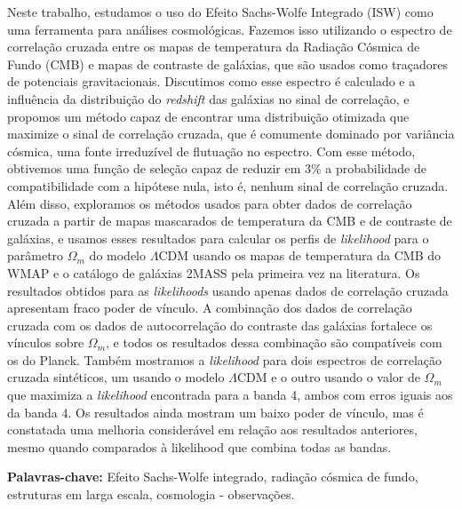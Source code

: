 \documentclass[openany,a4paper,12pt,oneside]{book}
\begin{document}
Neste trabalho, estudamos o uso do Efeito Sachs-Wolfe Integrado (ISW) como uma ferramenta para análises cosmológicas. Fazemos isso utilizando o espectro de correlação cruzada entre os mapas de temperatura da Radiação Cósmica de Fundo (CMB) e mapas de contraste de galáxias, que são usados como traçadores de potenciais gravitacionais. Discutimos como esse espectro é calculado e a influência da distribuição do \textit{redshift} das galáxias no sinal de correlação, e propomos um método capaz de encontrar uma distribuição otimizada que maximize o sinal de correlação cruzada, que é comumente dominado por variância cósmica, uma fonte irreduzível de flutuação no espectro. Com esse método, obtivemos uma função de seleção capaz de reduzir em $3\%$ a probabilidade de compatibilidade com a hipótese nula, isto é, nenhum sinal de correlação cruzada. Além disso, exploramos os métodos usados para obter dados de correlação cruzada a partir de mapas mascarados de temperatura da CMB e de contraste de galáxias, e usamos esses resultados para calcular os perfis de \textit{likelihood} para o parâmetro $\Omega_m$ do modelo $\Lambda$CDM usando os mapas de temperatura da CMB do WMAP e o catálogo de galáxias 2MASS pela primeira vez na literatura. Os resultados obtidos para as \textit{likelihoods} usando apenas dados de correlação cruzada apresentam fraco poder de vínculo. A combinação dos dados de correlação cruzada com os dados de autocorrelação do contraste das galáxias fortalece os vínculos sobre $\Omega_m$, e todos os resultados dessa combinação são compatíveis com os do Planck. Também mostramos a \textit{likelihood} para dois espectros de correlação cruzada sintéticos, um usando o modelo $\Lambda$CDM e o outro usando o valor de $\Omega_m$ que maximiza a \textit{likelihood} encontrada para a banda 4, ambos com erros iguais aos da banda 4. Os resultados ainda mostram um baixo poder de vínculo, mas é constatada uma melhoria considerável em relação aos resultados anteriores, mesmo quando comparados à likelihood que combina todas as bandas.

\vspace{1cm}

\noindent \textbf{Palavras-chave:} Efeito Sachs-Wolfe integrado, radiação cósmica de fundo, estruturas em larga escala, cosmologia - observações.

\end{document}
